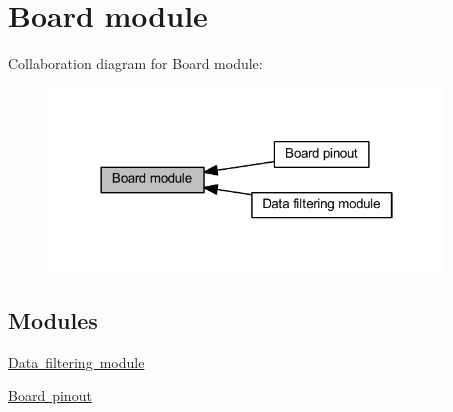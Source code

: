 \hypertarget{group___board__model__group}{}\section{Board module}
\label{group___board__model__group}
Collaboration diagram for Board module\+:\nopagebreak
\begin{figure}[H]
\begin{center}
\leavevmode
\includegraphics[width=298pt]{group___board__model__group}
\end{center}
\end{figure}
\subsection*{Modules}
\begin{DoxyCompactItemize}
\item 
\mbox{\hyperlink{group___filter__module__group}{Data filtering module}}
\item 
\mbox{\hyperlink{group___board__pinout__group}{Board pinout}}
\end{DoxyCompactItemize}
